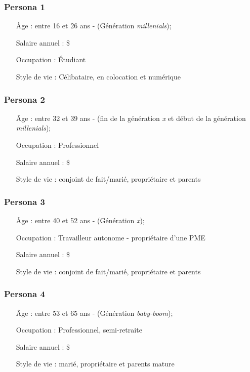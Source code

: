 \documentclass[11pt,french]{report}\usepackage[]{graphicx}\usepackage[]{color}
\begin{document}
\subsubsection*{Persona 1}
\begin{itemize}
\item[Âge :] entre 16 et 26 ans - (Génération \emph{millenials});
\item[Salaire annuel :]  \$
\item[Occupation :] Étudiant
\item[Style de vie : ] Célibataire, en colocation et numérique
\end{itemize}

\subsubsection*{Persona 2}
\begin{itemize}
\item[Âge :] entre 32 et 39 ans - (fin de la génération \emph{x} et début de la génération \emph{millenials});
\item[Occupation :] Professionnel
\item[Salaire annuel :]  \$
\item[Style de vie : ] conjoint de fait/marié, propriétaire et parents
\end{itemize}

\subsubsection*{Persona 3}
\begin{itemize}
\item[Âge :] entre 40 et 52 ans - (Génération \emph{x});
\item[Occupation :] Travailleur autonome - propriétaire d'une PME
\item[Salaire annuel :]  \$
\item[Style de vie : ] conjoint de fait/marié, propriétaire et parents
\end{itemize}

\subsubsection*{Persona 4}
\begin{itemize}
\item[Âge :] entre 53 et 65 ans - (Génération \emph{baby-boom});
\item[Occupation :] Professionnel, semi-retraite
\item[Salaire annuel :]  \$
\item[Style de vie : ] marié, propriétaire et parents mature
\end{itemize}
\end{document}
